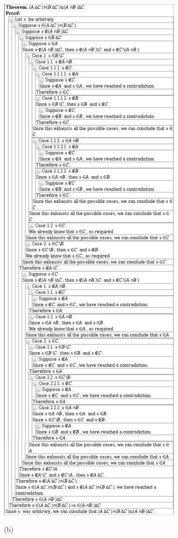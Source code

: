 \documentclass{article}
\begin{document}
\includegraphics[scale=0.10]{3_5_24_1}

\vspace{30pt}

(b)
\end{document}
